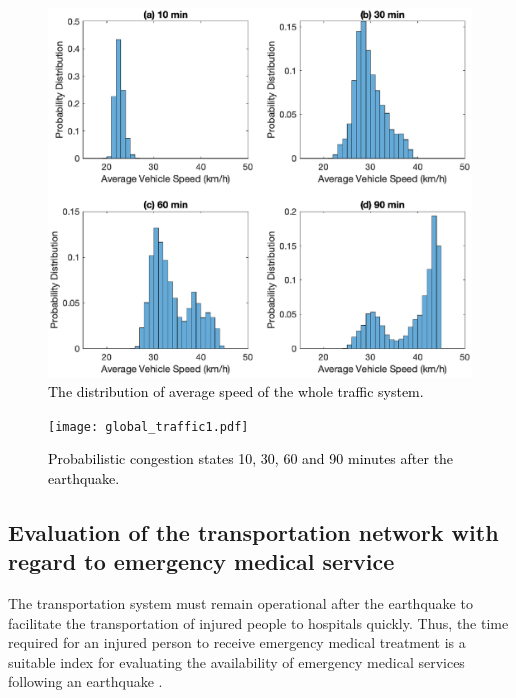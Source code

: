 \documentclass[review,11pt,nonatbib]{elsarticle}
\begin{document}
\begin{figure}[!htp]\centering
\includegraphics[width=15cm]{fig4.eps}
\caption{\textcolor{black}{The distribution of average speed of the whole traffic system.}}\label{fig4}
\end{figure}

\begin{figure}[!htp]\centering
\texttt{[image: global\_traffic1.pdf]}\\
\caption{\textcolor{black}{Probabilistic congestion states 10, 30, 60 and 90 minutes after the earthquake. }}\label{fig5}
\end{figure}


\subsection{Evaluation of the transportation network with regard to emergency medical service}
\par The transportation system must remain operational after the earthquake to facilitate the transportation of injured people to hospitals quickly. Thus, the time required for an injured person to receive emergency medical treatment is a suitable index for evaluating the availability of emergency medical services following an earthquake \citep{jones1995emergency,djalali2011facilitators}. 
\end{document}
